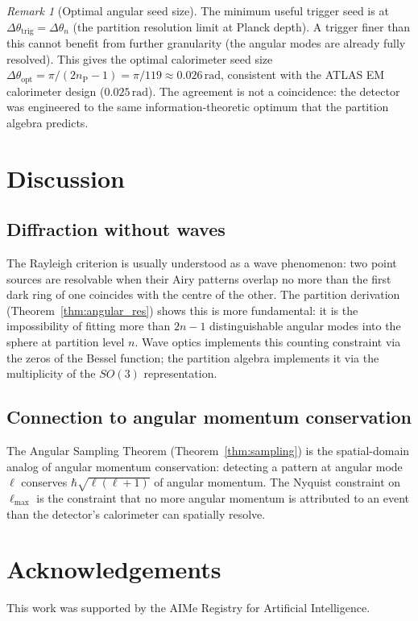 \documentclass[twocolumn,10pt,a4paper]{article}
\theoremstyle{thmstyle}
\theoremstyle{definition}
\theoremstyle{remark}
\newtheorem{remark}[theorem]{Remark}
\newcommand{\nP}{n_{\mathrm{P}}}
\begin{document}
\begin{remark}[Optimal angular seed size]
The minimum useful trigger seed is at $\Delta\theta_{\mathrm{trig}}
= \Delta\theta_n$ (the partition resolution limit at Planck depth).
A trigger finer than this cannot benefit from further granularity
(the angular modes are already fully resolved). This gives the
optimal calorimeter seed size $\Delta\theta_{\mathrm{opt}} = \pi/(2\nP-1)
= \pi/119 \approx 0.026\,\mathrm{rad}$,
consistent with the ATLAS EM calorimeter design ($0.025\,\mathrm{rad}$).
The agreement is not a coincidence: the detector was engineered to
the same information-theoretic optimum that the partition algebra predicts.
\end{remark}

\section{Discussion}
\label{sec:disc}

\subsection{Diffraction without waves}

The Rayleigh criterion is usually understood as a wave phenomenon:
two point sources are resolvable when their Airy patterns overlap
no more than the first dark ring of one coincides with the centre
of the other. The partition derivation (Theorem~\ref{thm:angular_res})
shows this is more fundamental: it is the impossibility of fitting
more than $2n-1$ distinguishable angular modes into the sphere at
partition level $n$. Wave optics implements this counting constraint
via the zeros of the Bessel function; the partition algebra implements
it via the multiplicity of the $SO(3)$ representation.

\subsection{Connection to angular momentum conservation}

The Angular Sampling Theorem (Theorem~\ref{thm:sampling}) is the
spatial-domain analog of angular momentum conservation: detecting
a pattern at angular mode $\ell$ conserves $\hbar\sqrt{\ell(\ell+1)}$
of angular momentum. The Nyquist constraint on $\ell_{\max}$ is the
constraint that no more angular momentum is attributed to an event
than the detector's calorimeter can spatially resolve.

\section*{Acknowledgements}
This work was supported by the AIMe Registry for Artificial Intelligence.



\end{document}
